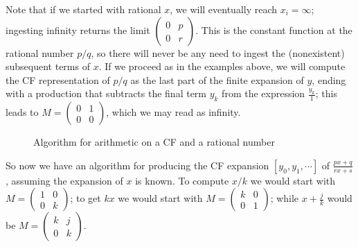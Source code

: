 \documentclass[11pt, oneside]{amsart}   	%
\newcommand{\pqrs}{\left(
\begin{smallmatrix} 
p & q\\ 
r & s 
\end{smallmatrix}
\right)}
\begin{document}
Note that if we started with rational $x$, we will eventually reach $x_i = \infty$; ingesting infinity returns the limit ${\left(
\begin{smallmatrix} 
0 & p\\ 
0 & r
\end{smallmatrix}
\right)}$. This is the constant function at the rational number $p/q$, so there will never be any need to ingest the (nonexistent) subsequent 
terms of $x$. If we proceed as in the examples above, we will compute the CF representation of $p/q$ as the last part of the finite expansion of $y$, ending with a production that subtracts the final term $y_k$ from the expression $\frac{y_k}{1}$; this leads to $M=\left(\begin{smallmatrix}0 & 1 \\ 0 & 0\end{smallmatrix}\right)$, which we may read as infinity.

\begin{figure}
\begin{algorithmic}\label{fig:oneCFarith}
 
 
\STATE{$M \gets \pqrs$} 
           \ENDWHILE
\ENDWHILE
\end{algorithmic}
\caption{Algorithm for arithmetic on a CF and a rational number}
\end{figure}

So now we have an algorithm for producing the CF expansion $[y_0,y_1,\cdots]$ of $\frac{px+q}{rx+s}$, assuming the expansion of $x$ is known. To compute $x/k$ we would start with $M=\left(
\begin{smallmatrix} 
1 & 0\\ 
0 & k 
\end{smallmatrix}
\right)$; 
to get $kx$ we would start with $M=\left(
\begin{smallmatrix} 
k & 0\\ 
0 & 1 
\end{smallmatrix}
\right)$; while $x+\frac{j}{k}$ would be $M=\left(
\begin{smallmatrix} 
k & j\\ 
0 & k 
\end{smallmatrix}
\right)$.
\end{document}
